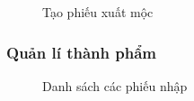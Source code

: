 \begin{figure}[H]
    \begin{center}
        \caption{Tạo phiếu xuất mộc}
        \label{mockup_export_raw_1}
    \end{center}
\end{figure}

\subsubsection{Quản lí thành phẩm}

\begin{figure}[H]
    \begin{center}
        \caption{Danh sách các phiếu nhập}
        \label{mockup_list_batch}
    \end{center}
\end{figure}

